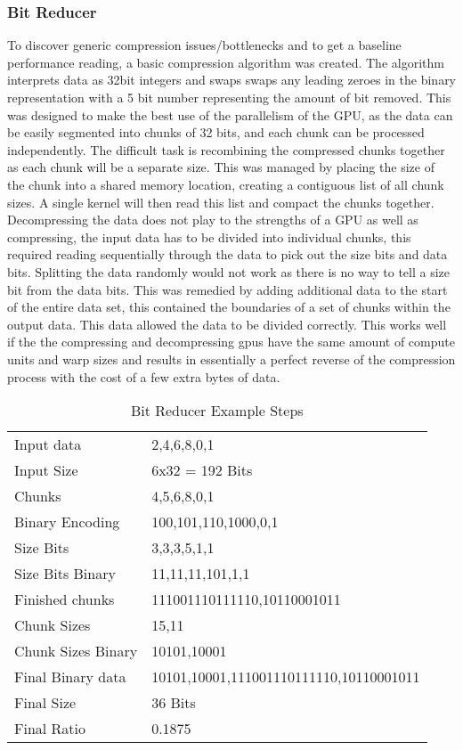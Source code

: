 \documentclass[12pt,a4paper]{article}
\begin{document}
\subsubsection{Bit Reducer}
To discover generic compression issues/bottlenecks and to get a baseline performance reading, a basic compression algorithm was created. The algorithm interprets data as 32bit integers and swaps swaps any leading zeroes in the binary representation with a 5 bit number representing the amount of bit removed.
This was designed to make the best use of the parallelism of the GPU, as the data can be easily segmented into chunks of 32 bits, and each chunk can be processed independently. The difficult task is recombining the compressed chunks together as each chunk will be a separate size. This was managed by placing the size of the chunk into a shared memory location, creating a contiguous list of all chunk sizes. A single kernel will then read this list and compact the chunks together. Decompressing the data does not play to the strengths of a GPU as well as compressing, the input data has to be divided into individual chunks, this required reading sequentially through the data to pick out the size bits and data bits. Splitting the data randomly would not work as there is no way to tell a size bit from the data bits. This was remedied by adding additional data to the start of the entire data set, this contained the boundaries of a set of chunks within the output data. This data allowed the data to be divided correctly. This works well if the the compressing and decompressing gpus have the same amount of compute units and warp sizes and results in essentially a perfect reverse of the compression process with the cost of a few extra bytes of data.

\begin{table*}[h]\centering
	\begin{tabular}{ll}\toprule
			Input data & 2,4,6,8,0,1\\
			Input Size & 6x32 = 192 Bits\\
			Chunks & {4,5,6},{8,0,1}\\
			Binary Encoding & {100,101,110},{1000,0,1}\\
			Size Bits & {3,3,3},{5,1,1}\\
			Size Bits Binary & {11,11,11},{101,1,1}\\
			Finished chunks & {111001110111110},{10110001011}\\
			Chunk Sizes & {15,11}\\
			Chunk Sizes Binary  & {10101,10001}\\
			Final Binary data  & 10101,10001,111001110111110,10110001011\\
			Final Size & 36 Bits\\
			Final Ratio & 0.1875\\
			\bottomrule
	\end{tabular}
	\caption{Bit Reducer Example Steps}
\end{table*}
\end{document}
